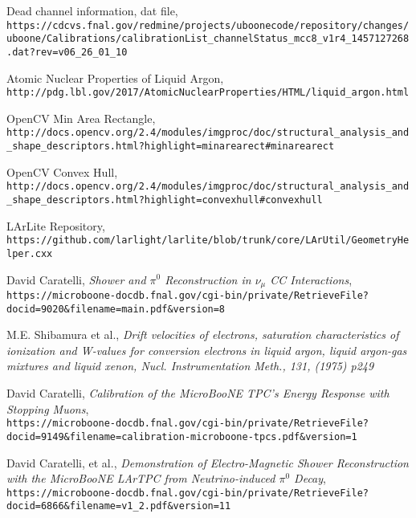 \begin{thebibliography}{20}
  Dead channel information, dat file, \\
  \texttt{https://cdcvs.fnal.gov/redmine/projects/uboonecode/repository/changes/uboone/Calibrations/calibrationList\_channelStatus\_mcc8\_v1r4\_1457127268.dat?rev=v06\_26\_01\_10}

  Atomic Nuclear Properties of Liquid Argon, \\
  \texttt{http://pdg.lbl.gov/2017/AtomicNuclearProperties/HTML/liquid\_argon.html}

  OpenCV Min Area Rectangle, \\
  \texttt{http://docs.opencv.org/2.4/modules/imgproc/doc/structural\_analysis\_and\_shape\_descriptors.html?highlight=minarearect\#minarearect}

  OpenCV Convex Hull, \\
  \texttt{http://docs.opencv.org/2.4/modules/imgproc/doc/structural\_analysis\_and\_shape\_descriptors.html?highlight=convexhull\#convexhull}

  LArLite Repository, \\
\texttt{https://github.com/larlight/larlite/blob/trunk/core/LArUtil/GeometryHelper.cxx}


  David Caratelli, \emph{Shower and $\pi^0$ Reconstruction in $\nu_{\mu}$ CC Interactions},\\
  \texttt{https://microboone-docdb.fnal.gov/cgi-bin/private/RetrieveFile?docid=9020\&filename=main.pdf\&version=8}

 M.E. Shibamura et al., \emph{Drift velocities of electrons, saturation characteristics of ionization
and W-values for conversion electrons in liquid argon, liquid argon-gas mixtures and liquid
xenon, Nucl. Instrumentation Meth., 131, (1975) p249}

  David Caratelli, \emph{Calibration of the MicroBooNE TPC’s Energy Response with Stopping Muons},\\
  \texttt{https://microboone-docdb.fnal.gov/cgi-bin/private/RetrieveFile?docid=9149\&filename=calibration-microboone-tpcs.pdf\&version=1}


  David Caratelli, et al., \emph{Demonstration of Electro-Magnetic Shower Reconstruction with the MicroBooNE LArTPC from Neutrino-induced $\pi^0$ Decay},\\
\texttt{https://microboone-docdb.fnal.gov/cgi-bin/private/RetrieveFile?docid=6866\&filename=v1\_2.pdf\&version=11}
  

\end{thebibliography}
